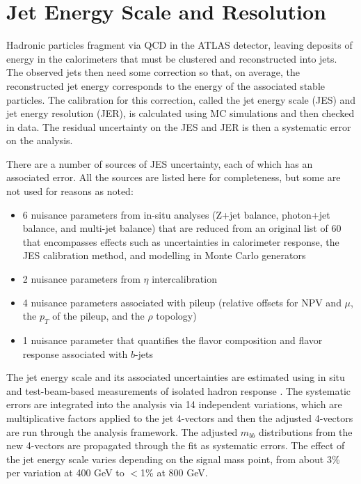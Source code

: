 \section{Jet Energy Scale and Resolution}
\label{sec:jes}
Hadronic particles fragment via QCD in the ATLAS detector, leaving deposits of 
energy in the calorimeters that must be clustered and reconstructed into jets.  The
observed jets then need some correction so that, on average, the reconstructed
jet energy corresponds to the energy of the associated stable particles.  The
calibration for this correction, called the jet energy scale (JES) and jet
energy resolution (JER), is calculated using MC simulations and then checked
in data.  The residual uncertainty on the JES and JER is then a systematic 
error on the analysis.

There are a number of sources of JES uncertainty, each of which has an associated error.
All the sources are listed here for completeness, but some are not used for reasons
as noted:
\begin{itemize}
    \item 6 nuisance parameters from in-situ analyses (Z+jet balance, photon+jet balance, and
    multi-jet balance) that are reduced from an original list of 60 that encompasses effects
    such as uncertainties in calorimeter response, the JES calibration method, and modelling
    in Monte Carlo generators
    \item 2 nuisance parameters from $\eta$ intercalibration
    \item 4 nuisance parameters associated with pileup (relative offsets for NPV and $\mu$,
    the $p_T$ of the pileup, and the $\rho$ topology)
    \item 1 nuisance parameter that quantifies the flavor composition and flavor
    response associated with $b$-jets
\end{itemize} 

The jet energy scale and its associated uncertainties are estimated using
in situ and test-beam-based measurements of isolated hadron response \cite{jes}.  The systematic
errors are integrated into the analysis via 14 independent variations, which are multiplicative factors applied to the jet
4-vectors and then the adjusted 4-vectors are run through the analysis framework.
The adjusted $m_{bb}$ distributions from the new 4-vectors are propagated through the fit as systematic
errors.  The effect of the jet energy scale varies depending on the signal mass
point, from about 3\% per variation at 400 GeV to $<$1\% at 800 GeV.


